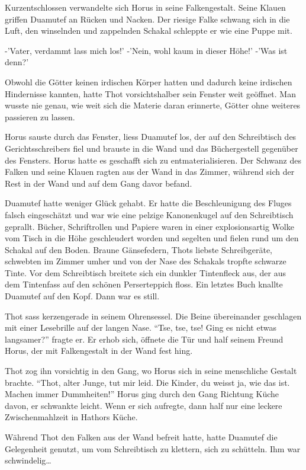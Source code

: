 \documentclass[11pt,titlepage,a5paper]{book}
\begin{document}
Kurzentschlossen verwandelte sich Horus in seine Falkengestalt. Seine Klauen griffen Duamutef an Rücken und Nacken. Der riesige Falke schwang sich in die Luft, den winselnden und zappelnden Schakal schleppte er wie eine Puppe mit.

-'Vater, verdammt lass mich los!' -'Nein, wohl kaum in dieser Höhe!' -'Was ist denn?'

Obwohl die Götter keinen irdischen Körper hatten und dadurch keine irdischen Hindernisse kannten, hatte Thot vorsichtshalber sein Fenster weit geöffnet. Man wusste nie genau, wie weit sich die Materie daran erinnerte, Götter ohne weiteres passieren zu lassen.

Horus sauste durch das Fenster, liess Duamutef los, der auf den Schreibtisch des Gerichtsschreibers fiel und brauste in die Wand und das Büchergestell  gegenüber  des Fensters. Horus hatte es geschafft sich zu entmaterialisieren. Der Schwanz des Falken und seine Klauen ragten aus der Wand in das Zimmer, während sich der Rest in der Wand und auf dem Gang davor befand.

 Duamutef hatte weniger Glück gehabt. Er hatte die Beschleunigung des Fluges falsch eingeschätzt und war wie eine pelzige Kanonenkugel auf den Schreibtisch geprallt. Bücher, Schriftrollen und Papiere waren in einer explosionsartig Wolke vom Tisch in die Höhe geschleudert worden und segelten und fielen rund um den Schakal auf den Boden. Braune Gänsefedern, Thots liebste Schreibgeräte, schwebten im Zimmer umher und von der Nase des Schakals tropfte schwarze Tinte. Vor dem Schreibtisch breitete sich ein dunkler Tintenfleck aus, der aus dem Tintenfass auf den schönen Perserteppich floss. Ein letztes Buch knallte Duamutef auf den Kopf. Dann war es still.

Thot sass kerzengerade in seinem Ohrensessel. Die Beine übereinander geschlagen mit einer Lesebrille auf der langen Nase. "`Tse, tse, tse! Ging es nicht etwas langsamer?"' fragte er. Er erhob sich, öffnete die Tür und half seinem Freund Horus, der mit Falkengestalt in der Wand fest hing.

 Thot zog ihn vorsichtig in den Gang, wo Horus sich in seine menschliche Gestalt brachte. "`Thot, alter Junge, tut mir leid. Die Kinder, du weisst ja, wie das ist. Machen immer Dummheiten!"' Horus ging durch den Gang Richtung Küche davon, er schwankte leicht. Wenn er sich aufregte, dann half nur eine leckere Zwischenmahlzeit in Hathors Küche.
 
 Während Thot den Falken aus der Wand befreit hatte, hatte Duamutef die Gelegenheit genutzt, um vom Schreibtisch zu klettern, sich zu schütteln. Ihm war schwindelig\dots
 
\end{document}
